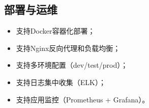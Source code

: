 \documentclass{../template/softeng}
\begin{document}
	\subsection{部署与运维}
	\begin{itemize}
		\item 支持Docker容器化部署；
		\item 支持Nginx反向代理和负载均衡；
		\item 支持多环境配置（dev/test/prod）；
		\item 支持日志集中收集（ELK）；
		\item 支持应用监控（Prometheus + Grafana）。
	\end{itemize}
\end{document}
